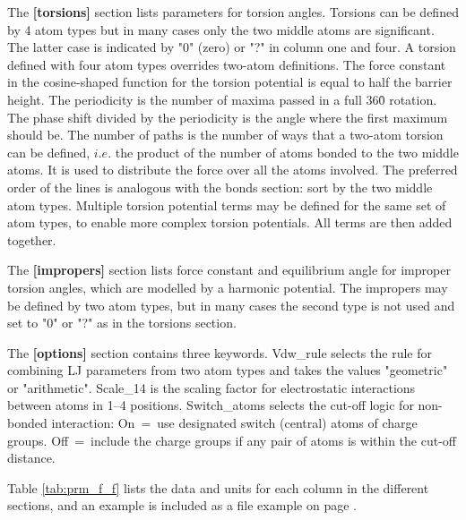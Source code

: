 \documentclass[a4paper,10pt]{article}
\begin{document}
The   \textbf{[torsions]}  section   lists   parameters  for   torsion
angles. Torsions can be defined by 4 atom types but in many cases only
the two middle atoms are significant.  The latter case is indicated by
"0" (zero) or "?" in column one  and four. A torsion defined with four
atom types overrides  two-atom definitions. The force  constant in the
cosine-shaped function for the torsion  potential is equal to half the
barrier height.  The periodicity is the  number of maxima passed  in a
full 360\r{ } rotation. The phase  shift divided by the periodicity is
the angle  where the first maximum  should be. The number  of paths is
the number of ways that a  two-atom torsion can be defined, $i.e.$ the
product of the number  of atoms bonded to the two  middle atoms. It is
used  to  distribute  the  force  over all  the  atoms  involved.  The
preferred order of the lines is analogous with the bonds section: sort
by the two middle atom types.  Multiple torsion potential terms may be
defined for the same set of atom types, to enable more complex torsion
potentials. All terms are then added together.

The \textbf{[impropers]} section lists  force constant and equilibrium
angle for  improper torsion angles,  which are modelled by  a harmonic
potential. The impropers may be defined by two atom types, but in many
cases the  second type is  not used and  set to "0"  or "?" as  in the
torsions section.

The \textbf{[options]}  section contains three  keywords.  Vdw{\_}rule
selects the rule  for combining LJ parameters from two  atom types and
takes  the values  "geometric"  or "arithmetic".   Scale{\_}14 is  the
scaling factor  for electrostatic  interactions between atoms  in 1--4
positions. Switch{\_}atoms  selects the  cut-off logic  for non-bonded
interaction:  On~=~use designated  switch  (central)  atoms of  charge
groups. Off~=~include the charge groups if any pair of atoms is within
the cut-off distance.

Table \ref{tab:prm_f_f}  lists the data  and units for each  column in
the different sections,  and an example is included as  a file example
on page \pageref{fig:prm_ex}.



\setcounter{table}{8}
\end{document}
